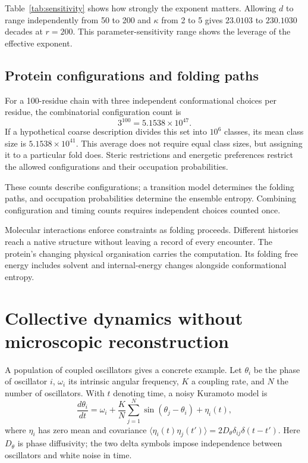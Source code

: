 \documentclass[10pt,a4paper,twocolumn]{article}
\numberwithin{equation}{section}
\begin{document}
Table~\ref{tab:sensitivity} shows how strongly the exponent matters. Allowing $d$ to range independently from 50 to 200 and $\kappa$ from 2 to 5 gives $23.0103$ to $230.1030$ decades at $r=200$. This parameter-sensitivity range shows the leverage of the effective exponent.

\subsection{Protein configurations and folding paths}

For a 100-residue chain with three independent conformational choices per residue, the combinatorial configuration count is
\begin{equation}
3^{100}=5.1538\times10^{47}.
\end{equation}
If a hypothetical coarse description divides this set into $10^6$ classes, its mean class size is $5.1538\times10^{41}$. This average does not require equal class sizes, but assigning it to a particular fold does. Steric restrictions and energetic preferences restrict the allowed configurations and their occupation probabilities.

These counts describe configurations; a transition model determines the folding paths, and occupation probabilities determine the ensemble entropy. Combining configuration and timing counts requires independent choices counted once.

Molecular interactions enforce constraints as folding proceeds. Different histories reach a native structure without leaving a record of every encounter. The protein's changing physical organisation carries the computation. Its folding free energy includes solvent and internal-energy changes alongside conformational entropy.

\section{Collective dynamics without microscopic reconstruction}

A population of coupled oscillators gives a concrete example. Let $\theta_i$ be the phase of oscillator $i$, $\omega_i$ its intrinsic angular frequency, $K$ a coupling rate, and $N$ the number of oscillators. With $t$ denoting time, a noisy Kuramoto model is
\begin{equation}
\frac{d\theta_i}{dt}=\omega_i+
\frac{K}{N}\sum_{j=1}^{N}\sin(\theta_j-\theta_i)+\eta_i(t),
\label{eq:kuramoto}
\end{equation}
where $\eta_i$ has zero mean and covariance
$\langle\eta_i(t)\eta_j(t')\rangle=2D_\theta\delta_{ij}\delta(t-t')$.
Here $D_\theta$ is phase diffusivity; the two delta symbols impose independence between oscillators and white noise in time.
\end{document}
